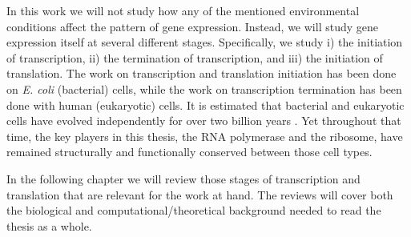 In this work we will not study how any of the mentioned environmental
conditions affect the pattern of gene expression. Instead, we will study gene
expression itself at several different stages. Specifically, we study i) the
initiation of transcription, ii) the termination of transcription, and iii) the
initiation of translation. The work on transcription and translation initiation
has been done on \textit{E. coli} (bacterial) cells, while the work on
transcription termination has been done with human (eukaryotic) cells. It is
estimated that bacterial and eukaryotic cells have evolved independently for
over two billion years \cite{vellai_origin_1999}. Yet throughout that time, the
key players in this thesis, the RNA polymerase and the ribosome, have remained
structurally and functionally conserved between those cell types.

In the following chapter we will review those stages of transcription and
translation that are relevant for the work at hand. The reviews will cover both
the biological and computational/theoretical background needed to read the
thesis as a whole.
